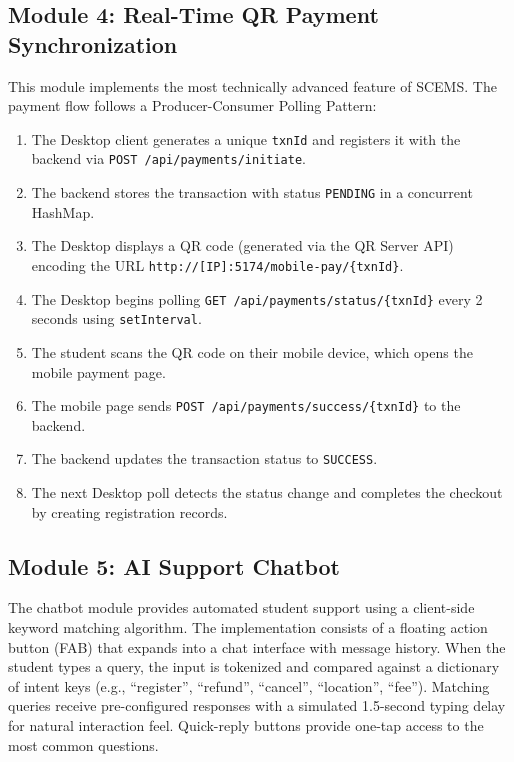 \subsection{Module 4: Real-Time QR Payment Synchronization}
This module implements the most technically advanced feature of SCEMS. The payment flow follows a Producer-Consumer Polling Pattern:
\begin{enumerate}
    \item The Desktop client generates a unique \texttt{txnId} and registers it with the backend via \texttt{POST /api/payments/initiate}.
    \item The backend stores the transaction with status \texttt{PENDING} in a concurrent HashMap.
    \item The Desktop displays a QR code (generated via the QR Server API) encoding the URL \texttt{http://[IP]:5174/mobile-pay/\{txnId\}}.
    \item The Desktop begins polling \texttt{GET /api/payments/status/\{txnId\}} every 2 seconds using \texttt{setInterval}.
    \item The student scans the QR code on their mobile device, which opens the mobile payment page.
    \item The mobile page sends \texttt{POST /api/payments/success/\{txnId\}} to the backend.
    \item The backend updates the transaction status to \texttt{SUCCESS}.
    \item The next Desktop poll detects the status change and completes the checkout by creating registration records.
\end{enumerate}

\subsection{Module 5: AI Support Chatbot}
The chatbot module provides automated student support using a client-side keyword matching algorithm. The implementation consists of a floating action button (FAB) that expands into a chat interface with message history. When the student types a query, the input is tokenized and compared against a dictionary of intent keys (e.g., ``register'', ``refund'', ``cancel'', ``location'', ``fee''). Matching queries receive pre-configured responses with a simulated 1.5-second typing delay for natural interaction feel. Quick-reply buttons provide one-tap access to the most common questions.

